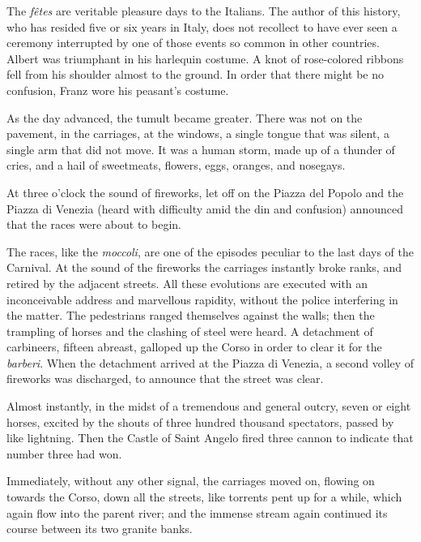 The \textit{fêtes} are veritable pleasure days to the Italians. The author of
this history, who has resided five or six years in Italy, does not
recollect to have ever seen a ceremony interrupted by one of those
events so common in other countries. Albert was triumphant in his
harlequin costume. A knot of rose-colored ribbons fell from his
shoulder almost to the ground. In order that there might be no
confusion, Franz wore his peasant’s costume.

As the day advanced, the tumult became greater. There was not on the
pavement, in the carriages, at the windows, a single tongue that was
silent, a single arm that did not move. It was a human storm, made up
of a thunder of cries, and a hail of sweetmeats, flowers, eggs,
oranges, and nosegays.

At three o’clock the sound of fireworks, let off on the Piazza del
Popolo and the Piazza di Venezia (heard with difficulty amid the din
and confusion) announced that the races were about to begin.

The races, like the \textit{moccoli}, are one of the episodes peculiar to the
last days of the Carnival. At the sound of the fireworks the carriages
instantly broke ranks, and retired by the adjacent streets. All these
evolutions are executed with an inconceivable address and marvellous
rapidity, without the police interfering in the matter. The pedestrians
ranged themselves against the walls; then the trampling of horses and
the clashing of steel were heard. A detachment of carbineers, fifteen
abreast, galloped up the Corso in order to clear it for the \textit{barberi}.
When the detachment arrived at the Piazza di Venezia, a second volley
of fireworks was discharged, to announce that the street was clear.

Almost instantly, in the midst of a tremendous and general outcry,
seven or eight horses, excited by the shouts of three hundred thousand
spectators, passed by like lightning. Then the Castle of Saint Angelo
fired three cannon to indicate that number three had won.

Immediately, without any other signal, the carriages moved on, flowing
on towards the Corso, down all the streets, like torrents pent up for a
while, which again flow into the parent river; and the immense stream
again continued its course between its two granite banks.

